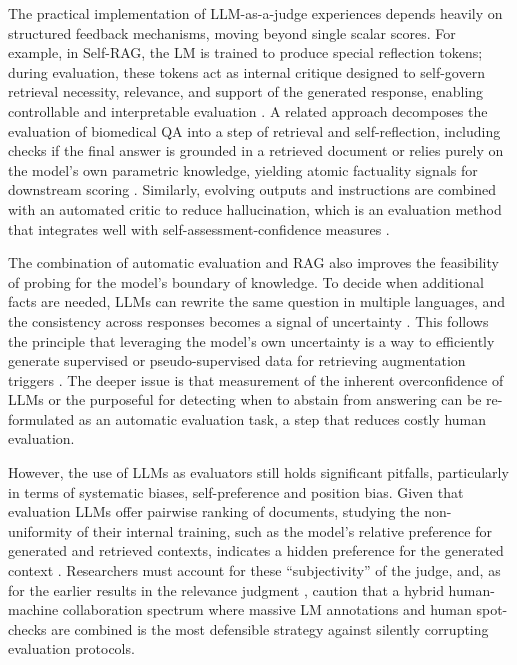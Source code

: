 \documentclass[11pt,a4paper]{article}
\begin{document}
The practical implementation of LLM-as-a-judge experiences depends heavily on structured feedback mechanisms, moving beyond single scalar scores. For example, in Self-RAG, the LM is trained to produce special reflection tokens; during evaluation, these tokens act as internal critique designed to self-govern retrieval necessity, relevance, and support of the generated response, enabling controllable and interpretable evaluation \cite{arxiv:2310.11511v1}. A related approach decomposes the evaluation of biomedical QA into a step of retrieval and self-reflection, including checks if the final answer is grounded in a retrieved document or relies purely on the model's own parametric knowledge, yielding atomic factuality signals for downstream scoring \cite{arxiv:2401.15269v2}. Similarly, evolving outputs and instructions are combined with an automated critic to reduce hallucination, which is an evaluation method that integrates well with self-assessment-confidence measures \cite{arxiv:2403.06840v1}.

The combination of automatic evaluation and RAG also improves the feasibility of probing for the model's boundary of knowledge. To decide when additional facts are needed, LLMs can rewrite the same question in multiple languages, and the consistency across responses becomes a signal of uncertainty \cite{arxiv:2402.10612v1}. This follows the principle that leveraging the model's own uncertainty is a way to efficiently generate supervised or pseudo-supervised data for retrieving augmentation triggers \cite{arxiv:2402.11457v1}. The deeper issue is that measurement of the inherent overconfidence of LLMs or the purposeful for detecting when to abstain from answering can be re-formulated as an automatic evaluation task, a step that reduces costly human evaluation.

However, the use of LLMs as evaluators still holds significant pitfalls, particularly in terms of systematic biases, self-preference and position bias. Given that evaluation LLMs offer pairwise ranking of documents, studying the non-uniformity of their internal training, such as the model's relative preference for generated and retrieved contexts, indicates a hidden preference for the generated context \cite{arxiv:2401.11911v4}. Researchers must account for these ``subjectivity'' of the judge, and, as for the earlier results in the relevance judgment \cite{arxiv:2304.09161v2}, caution that a hybrid human-machine collaboration spectrum where massive LM annotations and human spot-checks are combined is the most defensible strategy against silently corrupting evaluation protocols.
\end{document}
